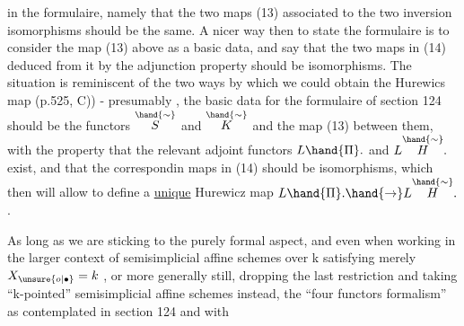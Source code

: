 in the formulaire, namely that the two maps (13) associated to the two
inversion isomorphisms should be the same. A nicer way then to state
the formulaire is to consider the map (13) above as a basic data, and
say that the two maps in (14) deduced from it by the adjunction property
should be isomorphisms. The situation is reminiscent of the two ways
by which we could obtain the Hurewics map (p.525, C)) - presumably ,
the basic data for the formulaire of section 124 should be the functors
$\overset{\hand{\sim}}{S}$ and $\overset{\hand{\sim}}{K}$ and the map  (13) between them, with the property that the
relevant adjoint functors $L\hand{\Pi}.$ and $L\overset{\hand{\sim}}{H}.$ exist, and that the correspondin
maps in (14) should be isomorphisms, which then will allow to define
a \uline{unique} Hurewicz map $L\hand{\Pi}. \hand{\rightarrow} L\overset{\hand{\sim}}{H}.$ .

As long as we are sticking to the purely formal aspect, and even
when working in the larger context of semisimplicial affine schemes over
k satisfying merely $X_{\unsure{o|\bullet}}=k$ , or more generally still, dropping the last
restriction and taking ``k-pointed'' semisimplicial affine schemes instead,
the  ``four functors formalism''  as contemplated in section 124\xout{,} \hand{(}and with

